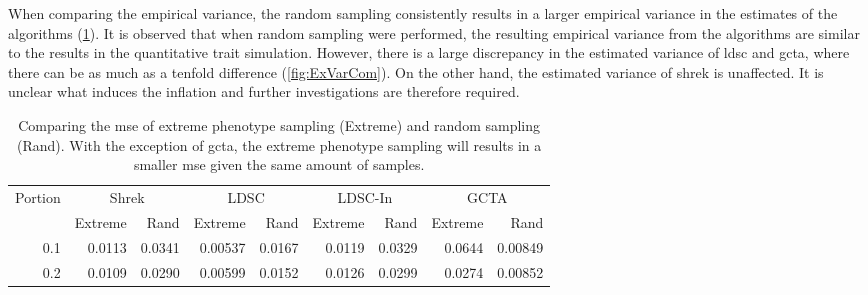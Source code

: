 		When comparing the empirical variance, the random sampling consistently results in a larger empirical variance in the estimates of the algorithms (\cref{tab:ratioEx}).	
		It is observed that when random sampling were performed, the resulting empirical variance from the algorithms are similar to the results in the quantitative trait simulation. 
		However, there is a large discrepancy in the estimated variance of \gls{ldsc} and \gls{gcta}, where there can be as much as a tenfold difference (\cref{fig:ExVarCom}). 
		On the other hand, the estimated variance of \gls{shrek} is unaffected.
		It is unclear what induces the inflation and further investigations are therefore required.
		
		\begin{table}[H]
			\centering
			\begin{tabular}{rrrrrrrrr}
				\toprule
				\multirow{2}[4]{*}{Portion} & \multicolumn{2}{c}{Shrek} & \multicolumn{2}{c}{LDSC} & \multicolumn{2}{c}{LDSC-In} & \multicolumn{2}{c}{GCTA} \\
				& Extreme & Rand & Extreme & Rand & Extreme & Rand & Extreme & Rand\\
				\midrule
				0.1   & 0.0113 & 0.0341 & 0.00537 & 0.0167 & 0.0119 & 0.0329 & 0.0644 & 0.00849 \\
				0.2   & 0.0109 & 0.0290 & 0.00599 & 0.0152 & 0.0126 & 0.0299 & 0.0274 & 0.00852 \\
				\bottomrule
			\end{tabular}
			\caption[Comparing the MSE of Extreme Phenotype Sampling and Random Sampling]{
				Comparing the \gls{mse} of extreme phenotype sampling (Extreme) and random sampling (Rand).
				With the exception of \gls{gcta}, the extreme phenotype sampling will results in a smaller \gls{mse} given the same amount of samples.
			}
			\label{tab:ratioEx}
		\end{table}
		
		
